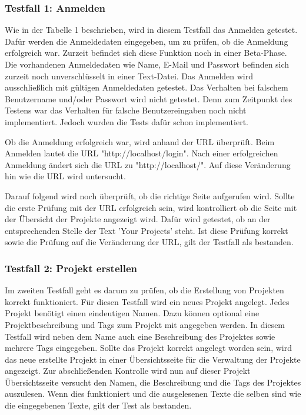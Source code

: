 \documentclass{llncs}
\begin{document}
\subsubsection{Testfall 1: Anmelden}
Wie in der Tabelle 1 beschrieben, wird in diesem Testfall das Anmelden getestet. Dafür werden die Anmeldedaten eingegeben, um zu prüfen, ob die Anmeldung erfolgreich war. Zurzeit befindet sich diese Funktion noch in einer Beta-Phase. Die vorhandenen Anmeldedaten wie Name, E-Mail und Passwort befinden sich zurzeit noch unverschlüsselt in einer Text-Datei. Das Anmelden wird ausschließlich mit gültigen Anmeldedaten getestet. Das Verhalten bei falschem Benutzername und/oder Passwort wird nicht getestet. Denn zum Zeitpunkt des Testens war das Verhalten für falsche Benutzereingaben noch nicht implementiert. Jedoch wurden die Tests dafür schon implementiert.

Ob die Anmeldung erfolgreich war, wird anhand der URL überprüft. Beim Anmelden lautet die URL "http://localhost/login". Nach einer erfolgreichen Anmeldung ändert sich die URL zu "http://localhost/". Auf diese Veränderung hin wie die URL wird untersucht. 

Darauf folgend wird noch überprüft, ob die richtige Seite aufgerufen wird. Sollte die erste Prüfung mit der URL erfolgreich sein, wird kontrolliert ob die Seite mit der Übersicht der Projekte angezeigt wird. Dafür wird getestet, ob an der entsprechenden Stelle der Text 'Your Projects' steht. Ist diese Prüfung korrekt sowie die Prüfung auf die Veränderung der URL, gilt der Testfall als bestanden.

\subsubsection{Testfall 2: Projekt erstellen}
Im zweiten Testfall geht es darum zu prüfen, ob die Erstellung von Projekten korrekt funktioniert. Für diesen Testfall wird ein neues Projekt angelegt. Jedes Projekt benötigt einen eindeutigen Namen. Dazu können optional eine Projektbeschreibung und Tags zum Projekt mit angegeben werden. In diesem Testfall wird neben dem Name auch eine Beschreibung des Projektes sowie mehrere Tags eingegeben. Sollte das Projekt korrekt angelegt worden sein, wird das neue erstellte Projekt in einer Übersichtsseite für die Verwaltung der Projekte angezeigt. Zur abschließenden Kontrolle wird nun auf dieser Projekt Übersichtsseite versucht den Namen, die Beschreibung und die Tags des Projektes auszulesen. Wenn dies funktioniert und die ausgelesenen Texte die selben sind wie die eingegebenen Texte, gilt der Test als bestanden.
\end{document}
